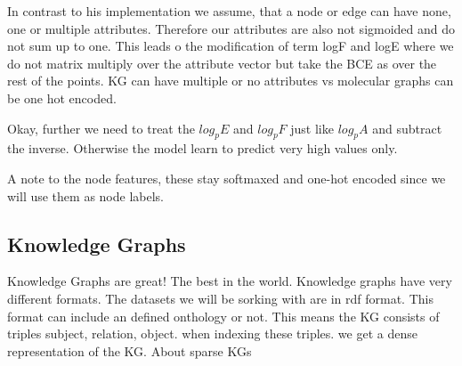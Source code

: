In contrast to his implementation we assume, that a node or edge can have none, one or multiple attributes. Therefore our attributes are also not sigmoided and do not sum up to one. This leads o the modification of term logF and logE where we do not matrix multiply over the attribute vector but take the BCE as over the rest of the points.
KG can have multiple or no attributes vs molecular graphs can be one hot encoded.

Okay, further we need to treat the $log_pE$ and $log_pF$ just like $log_pA$ and subtract the inverse. Otherwise the model learn to predict very high values only. 

A note to the node features, these stay softmaxed and one-hot encoded since we will use them as node labels.

\subsection{Knowledge Graphs}

Knowledge Graphs are great! The best in the world.
Knowledge graphs have very different formats. The datasets we will be sorking with are in rdf format.
This format can include an defined onthology or not.
This means the KG consists of triples subject, relation, object.
when indexing these triples. we get a dense representation of the KG.
About sparse KGs

